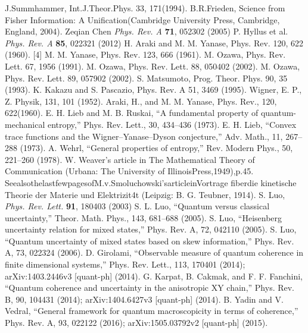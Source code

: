 \begin{thebibliography}{}
  J.Summhammer, Int.J.Theor.Phys. 33, 171(1994).
  B.R.Frieden, Science from Fisher Information: A Unification(Cambridge University Press, Cambridge, England, 2004).
  Zeqian Chen \textit{Phys. Rev. A} \textbf{71}, 052302 (2005)
  P. Hyllus et al. \textit{Phys. Rev. A} \textbf{85}, 022321 (2012)
  H. Araki and M. M. Yanase, Phys. Rev. 120, 622 (1960). [4] M. M. Yanase, Phys. Rev. 123, 666 (1961).
  M. Ozawa, Phys. Rev. Lett. 67, 1956 (1991).
  M. Ozawa, Phys. Rev. Lett. 88, 050402 (2002).
  M. Ozawa, Phys. Rev. Lett. 89, 057902 (2002).
  S. Matsumoto, Prog. Theor. Phys. 90, 35 (1993).
  K. Kakazu and S. Pascazio, Phys. Rev. A 51, 3469 (1995).
  Wigner, E. P., Z. Physik, 131, 101 (1952).
  Araki, H., and M. M. Yanase, Phys. Rev., 120, 622(1960).
  E. H. Lieb and M. B. Ruskai, “A fundamental property of quantum-mechanical entropy,” Phys. Rev. Lett., 30, 434–436 (1973).
  E. H. Lieb, “Convex trace functions and the Wigner–Yanase–Dyson conjecture,” Adv. Math., 11, 267–288 (1973).
  A. Wehrl, “General properties of entropy,” Rev. Modern Phys., 50, 221–260 (1978).
  W. Weaver's article in The Mathematical Theory of Communication (Urbana: The University of IllinoisPress,1949),p.45. SeealsothelastfewpagesofM.v.Smoluchowski'sarticleinVortrage fiberdie kinetische Theorie der Materie und Elektrizit4t (Leipzig: B. G. Teubner, 1914).
  S. Luo, \textit{Phys. Rev. Lett.} \textbf{91}, 180403 (2003)
  S. L. Luo, “Quantum versus classical uncertainty,” Theor. Math. Phys., 143, 681–688 (2005).
  S. Luo, “Heisenberg uncertainty relation for mixed states,” Phys. Rev. A, 72, 042110 (2005).
  S. Luo, “Quantum uncertainty of mixed states based on skew information,” Phys. Rev. A, 73, 022324 (2006).
  D. Girolami, “Observable measure of quantum coherence in finite dimensional systems,” Phys. Rev. Lett., 113, 170401 (2014); arXiv:1403.2446v3 [quant-ph] (2014).
  G. Karpat, B. Cakmak, and F. F. Fanchini, “Quantum coherence and uncertainty in the anisotropic XY chain,” Phys. Rev. B, 90, 104431 (2014); arXiv:1404.6427v3 [quant-ph] (2014).
  B. Yadin and V. Vedral, “General framework for quantum macroscopicity in terms of coherence,” Phys. Rev. A, 93, 022122 (2016); arXiv:1505.03792v2 [quant-ph] (2015).

\end{thebibliography}
